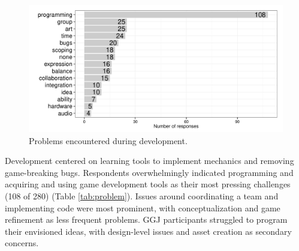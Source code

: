 \documentclass{sig-alternate}
\begin{document}
\begin{figure}[tbph]
\centering
\includegraphics[width=\linewidth]{./problem}
\caption{Problems encountered during development.}
\label{fig:problem}
\end{figure}

Development centered on learning tools to implement mechanics and removing game-breaking bugs. 
Respondents overwhelmingly indicated programming and acquiring and using game development tools as their most pressing challenges (108 of 280) (Table \ref{tab:problem}).
Issues around coordinating a team and implementing code were most prominent, with conceptualization and game refinement as less frequent problems.
GGJ participants struggled to program their envisioned ideas, with design-level issues and asset creation as secondary concerns.



\end{document}
